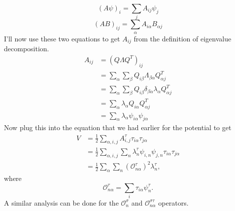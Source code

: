 \documentclass[12pt]{extarticle}
\newcommand{\tia}{\tau_{i\alpha}}
\newcommand{\tja}{\tau_{j\alpha}}
\newcommand{\Ot}{\mathcal{O}^\tau_{n\alpha}}
\newcommand{\Os}{\mathcal{O}^\sigma_{n}}
\newcommand{\Ost}{\mathcal{O}^{\sigma\tau}_{n\alpha}}
\newcommand{\Aijt}{A^{\tau}_{i,j}}
\begin{document}
\begin{equation}
   (A\psi)_i = \sum\limits_jA_{ij}\psi_j
\end{equation}
\begin{equation}
   (AB)_{ij}=\sum\limits_\alpha A_{i\alpha} B_{\alpha j}
\end{equation}
I'll now use these two equations to get $A_{ij}$ from the definition of eigenvalue decomposition.
\begin{align}
   A_{ij} &= \left(Q\Lambda Q^T\right)_{ij} \\
   &=\sum\limits_\alpha\sum\limits_\beta Q_{i\beta}\Lambda_{\beta\alpha}Q^T_{\alpha j} \\
   &=\sum\limits_\alpha\sum\limits_\beta Q_{i\beta}\delta_{\beta\alpha}\lambda_\alpha Q^T_{\alpha j} \\
   &=\sum\limits_\alpha \lambda_\alpha Q_{i\alpha}Q^T_{\alpha j} \\
   &=\sum\limits_\alpha \lambda_\alpha \psi_{i\alpha}\psi_{j\alpha}
\end{align}
Now plug this into the equation that we had earlier for the potential to get
\begin{align}
   V &= \frac{1}{2}\sum\limits_{\alpha,i,j} \Aijt\tia\tja \\
   &= \frac{1}{2}\sum\limits_{\alpha,i,j}\sum\limits_n\lambda_n^\tau\psi_{i,n}\psi_{j,n}\tia\tja \\
   &= \frac{1}{2}\sum\limits_\alpha\sum\limits_n\left(\Ot\right)^2\lambda^\tau_n,
   \label{equ:Vtau}
\end{align}
where
\begin{equation}
   \Ot = \sum\limits_i \tau_{i\alpha}\psi^\tau_n.
\end{equation}
A similar analysis can be done for the $\Os$ and $\Ost$ operators.



\end{document}
